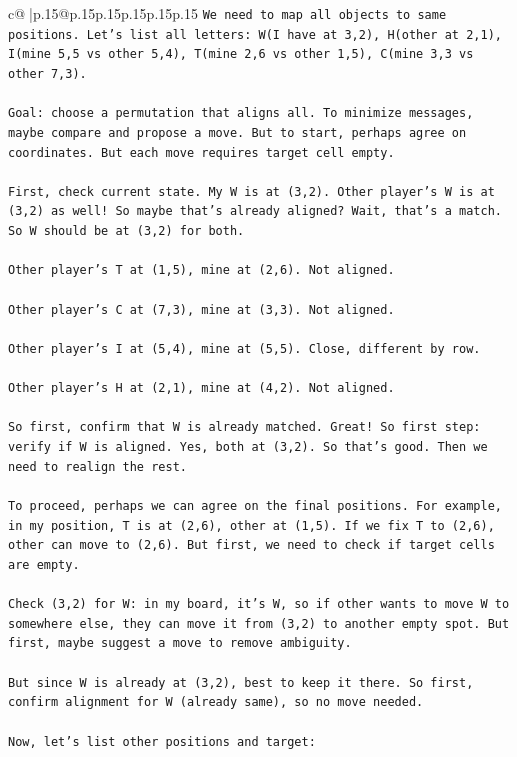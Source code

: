 \documentclass{article}
\begin{document}
{\begin{supertabular}{c@{$\;$}|p{.15\linewidth}@{}p{.15\linewidth}p{.15\linewidth}p{.15\linewidth}p{.15\linewidth}p{.15\linewidth}}
{{{\texttt{We need to map all objects to same positions. Let's list all letters: W(I have at 3,2), H(other at 2,1), I(mine 5,5 vs other 5,4), T(mine 2,6 vs other 1,5), C(mine 3,3 vs other 7,3).} \\
\\ 
\texttt{Goal: choose a permutation that aligns all. To minimize messages, maybe compare and propose a move. But to start, perhaps agree on coordinates. But each move requires target cell empty.} \\
\\ 
\texttt{First, check current state. My W is at (3,2). Other player's W is at (3,2) as well! So maybe that's already aligned? Wait, that's a match. So W should be at (3,2) for both.} \\
\\ 
\texttt{Other player's T at (1,5), mine at (2,6). Not aligned.} \\
\\ 
\texttt{Other player's C at (7,3), mine at (3,3). Not aligned.} \\
\\ 
\texttt{Other player's I at (5,4), mine at (5,5). Close, different by row.} \\
\\ 
\texttt{Other player's H at (2,1), mine at (4,2). Not aligned.} \\
\\ 
\texttt{So first, confirm that W is already matched. Great! So first step: verify if W is aligned. Yes, both at (3,2). So that's good. Then we need to realign the rest.} \\
\\ 
\texttt{To proceed, perhaps we can agree on the final positions. For example, in my position, T is at (2,6), other at (1,5). If we fix T to (2,6), other can move to (2,6). But first, we need to check if target cells are empty.} \\
\\ 
\texttt{Check (3,2) for W: in my board, it's W, so if other wants to move W to somewhere else, they can move it from (3,2) to another empty spot. But first, maybe suggest a move to remove ambiguity.} \\
\\ 
\texttt{But since W is already at (3,2), best to keep it there. So first, confirm alignment for W (already same), so no move needed.} \\
\\ 
\texttt{Now, let's list other positions and target:} \\
}}}
\end{supertabular}}
\end{document}
